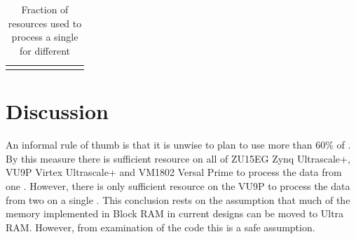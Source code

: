\documentclass{article}
\begin{document}
\begin{table}[ht]
\begin{tabular}{p{2.2cm} | p{1.5cm} | p{1.3cm} p{1.3cm} | p{1.3cm} p{1.5cm} | p{1.3cm} p{1.5cm}}
\end{tabular}
\caption{Fraction of  resources used to process a single  for different  }
\label{tab:resource_fraction}
\end{table}

\section{Discussion}

An informal rule of thumb is that it is unwise to plan to use more than 60\% of . By this measure there is sufficient resource on all of ZU15EG Zynq Ultrascale+, VU9P Virtex Ultrascale+ and VM1802 Versal Prime to process the data from one . However, there is only sufficient resource on the VU9P to process the data from two  on a single . This conclusion rests on the assumption that much of the memory implemented in Block RAM in current designs can be moved to Ultra RAM. However, from examination of the code this is a safe assumption. 

\newpage
\printglossary
\end{document}
